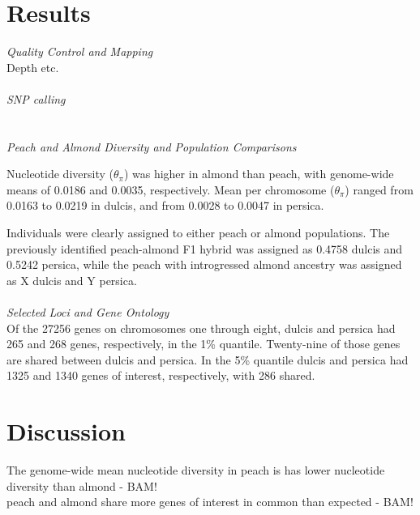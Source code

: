 \documentclass[12pt]{article}
\begin{document}

\section*{Results}
\emph{Quality Control and Mapping}\\
Depth etc.\\
%
\\
\emph{SNP calling}\\
\\
%
\\
\emph{Peach and Almond Diversity and Population Comparisons}

Nucleotide diversity ($\theta_{\pi}$) was higher in almond than peach, with genome-wide means of 0.0186 and 0.0035, respectively. 
%
Mean per chromosome ($\theta_{\pi}$) ranged from 0.0163 to 0.0219 in dulcis, and from 0.0028 to 0.0047 in persica.

Individuals were clearly assigned to either peach or almond populations. 
%
The previously identified peach-almond F1 hybrid was assigned as 0.4758 dulcis and 0.5242 persica, while the peach with introgressed almond ancestry was assigned as X dulcis and Y persica.
\\
%
\\
\emph{Selected Loci and Gene Ontology}\\
Of the 27256 genes on chromosomes one through eight, dulcis and persica had 265 and 268 genes, respectively, in the 1\% quantile. 
%
Twenty-nine of those genes are shared between dulcis and persica.
%
In the 5\% quantile dulcis and persica had 1325 and 1340 genes of interest, respectively, with 286 shared.
\\


\section*{Discussion}
The genome-wide mean nucleotide diversity in peach is has lower nucleotide diversity than almond - BAM!
%
\\
peach and almond share more genes of interest in common than expected - BAM!
%
\end{document}

